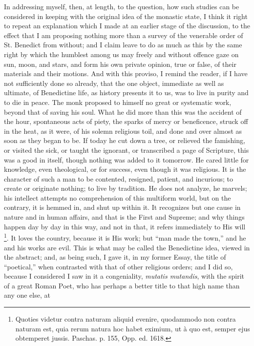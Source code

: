 In addressing myself, then, at length, to the question, how
such studies can be considered in keeping with the original idea of
the monastic state, I think it right to repeat an explanation which I
made at an earlier stage of the discussion, to the effect that I am
proposing nothing more than a survey of the venerable order of St.
Benedict from without; and I claim leave to do as much as this by the
same right by which the humblest among us may freely and without
offence gaze on sun, moon, and stars, and form his own private
opinion, true or false, of their materials and their motions. And with
this proviso, I remind the reader, if I have not sufficiently done so
already, that the one object, immediate as well as ultimate, of
Benedictine life, as history presents it to us, was to live in purity
and to die in peace. The monk proposed to himself no great or
systematic work, beyond that of saving his soul. What he did more than
this was the accident of the hour, spontaneous acts of piety, the
sparks of mercy or beneficence, struck off in the heat, as it were, of
his solemn religious toil, and done and over almost as soon as they
began to be. If today he cut down a tree, or relieved the famishing,
or visited the sick, or taught the ignorant, or transcribed a page of
Scripture, this was a good in itself, though nothing was added to it
tomorrow. He cared little for knowledge, even theological, or for
success, even though it was religious. It is the character of such a
man to be contented, resigned, patient, and incurious; to create or
originate nothing; to live by tradition. He does not analyze, he
marvels; his intellect attempts no comprehension of this multiform
world, but on the contrary, it is hemmed in, and shut up within it. It
recognizes but one cause in nature and in human affairs, and that is
the First and Supreme; and why things happen day by day in this way,
and not in that, it refers immediately to His will \footnote{Quoties
videtur contra naturam aliquid evenire, quodammodo non contra naturam
est, quia rerum natura hoc habet eximium, ut à quo est, semper ejus
obtemperet jussis. Paschas. p. 155, Opp. ed. 1618.}. It loves the country, because it is His work; but ``man
made the town,'' and he and his works are evil. This is what may
be called the Benedictine idea, viewed in the abstract; and, as being
such, I gave it, in my former Essay, the title of
``poetical,'' when contrasted with that of other religious
orders; and I did so, because I considered I saw in it a congeniality,
\emph{mutatis mutandis}, with the spirit of a great Roman Poet, who
has perhaps a better title to that high name than any one else, at
